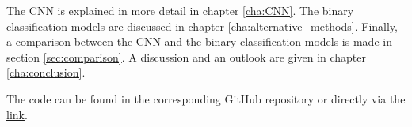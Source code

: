 
\noindent
The CNN is explained in more detail in chapter \ref{cha:CNN}.
The binary classification models are discussed in chapter \ref{cha:alternative_methods}.
Finally, a comparison between the CNN and the binary classification models is made in section \ref{sec:comparison}.
A discussion and an outlook are given in chapter \ref{cha:conclusion}.

The code can be found in the corresponding GitHub repository \cite{project} or directly via the \href{https://github.com/joeyko2706/MachineLearning24/tree/main}{link}.




